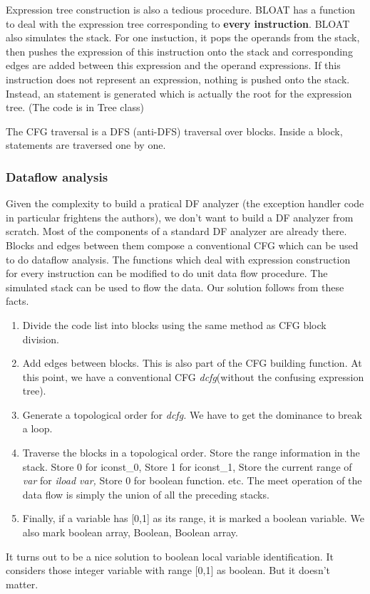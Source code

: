 \vspace{0.3cm}
Expression tree construction is also a tedious procedure.
BLOAT has a function to deal with the expression tree corresponding
to \textbf{every instruction}.  BLOAT also simulates the stack.
For one instuction, it pops the operands from the stack, then pushes
the expression of this instruction onto the stack and corresponding
edges are added between this expression and the operand expressions. If
this instruction does not represent an expression, nothing is pushed
onto the stack. Instead, an statement is generated which is actually
the root for the expression tree.  (The code is in Tree class)

The CFG traversal is a DFS (anti-DFS) traversal over blocks.
Inside a block, statements are traversed one by one.


\subsubsection{Dataflow analysis}

Given the complexity to build a pratical DF analyzer (the exception handler
code in particular frightens the authors), we don't
want to build a DF analyzer from scratch.  Most of the components
of a standard DF analyzer are already there. Blocks and edges between
them compose a conventional CFG which can be used to do dataflow
analysis.  The functions which deal with expression construction for
every instruction can be modified to do unit data flow procedure.
The simulated stack can be used to flow the data. Our solution follows from
these facts.

\begin{enumerate}
\item Divide the code list into blocks using the same method as CFG block division.
\item Add edges between blocks.  This is also part of the CFG building function.
At this point, we have a conventional CFG \emph{dcfg}(without the confusing expression
tree).
\item Generate a topological order for \emph{dcfg.} We have to get the
dominance to break a loop.
\item Traverse the blocks in a topological order. Store the range information
in the stack. Store 0 for iconst\_0, Store 1 for iconst\_1, Store the
current range of \emph{var} for \emph{iload var,} Store 0 for boolean
function. etc. The meet operation of the data flow is simply the union
of all the preceding stacks.
\item Finally, if a variable has {[}0,1{]} as its range, it is marked a
boolean variable. We also mark boolean array, Boolean, Boolean array.
\end{enumerate}
It turns out to be a nice solution to boolean local variable identification.
It considers those integer variable with range {[}0,1{]} as boolean.
But it doesn't matter.



